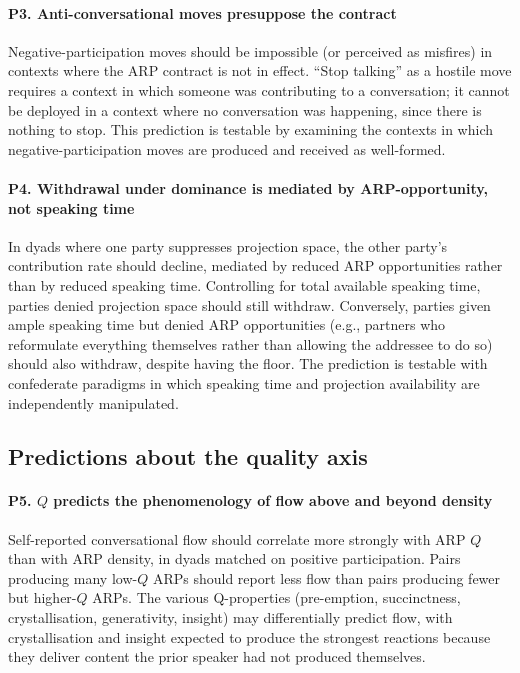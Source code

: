 \paragraph{P3. Anti-conversational moves presuppose the contract} Negative-participation moves should be impossible (or perceived as misfires) in contexts where the ARP contract is not in effect. ``Stop talking'' as a hostile move requires a context in which someone was contributing to a conversation; it cannot be deployed in a context where no conversation was happening, since there is nothing to stop. This prediction is testable by examining the contexts in which negative-participation moves are produced and received as well-formed.

\paragraph{P4. Withdrawal under dominance is mediated by ARP-opportunity, not speaking time} In dyads where one party suppresses projection space, the other party's contribution rate should decline, mediated by reduced ARP opportunities rather than by reduced speaking time. Controlling for total available speaking time, parties denied projection space should still withdraw. Conversely, parties given ample speaking time but denied ARP opportunities (e.g., partners who reformulate everything themselves rather than allowing the addressee to do so) should also withdraw, despite having the floor. The prediction is testable with confederate paradigms in which speaking time and projection availability are independently manipulated.

\subsection{Predictions about the quality axis}

\paragraph{P5. $Q$ predicts the phenomenology of flow above and beyond density} Self-reported conversational flow should correlate more strongly with ARP $Q$ than with ARP density, in dyads matched on positive participation. Pairs producing many low-$Q$ ARPs should report less flow than pairs producing fewer but higher-$Q$ ARPs. The various Q-properties (pre-emption, succinctness, crystallisation, generativity, insight) may differentially predict flow, with crystallisation and insight expected to produce the strongest reactions because they deliver content the prior speaker had not produced themselves.

